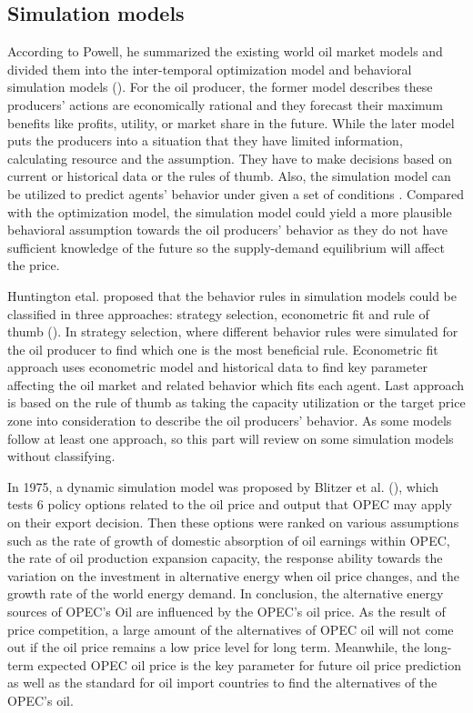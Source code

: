 \subsection{Simulation models}
According to Powell, he summarized the existing world oil market models and divided them into the inter-temporal optimization model and behavioral simulation models (\cite{powell1990target}). For the oil producer, the former model describes these producers' actions are economically rational and they forecast their maximum benefits like profits, utility, or market share in the future. While the later model puts the producers into a situation that they have limited information, calculating resource and the assumption. They have to make decisions based on current or historical data or the rules of thumb. Also, the simulation model can be utilized to predict agents' behavior under given a set of conditions \cite{wurbs1993reservoir}. Compared with the optimization model, the simulation model could yield a more plausible behavioral assumption towards the oil producers' behavior as they do not have sufficient knowledge of the future so the supply-demand equilibrium will affect the price.

Huntington etal. proposed that the behavior rules in simulation models could be classified in three approaches: strategy selection, econometric fit and rule of thumb (\cite{huntington2013oil}). In strategy selection, where different behavior rules were simulated for the oil producer to find which one is the most beneficial rule. Econometric fit approach uses econometric model and historical data to find key parameter affecting the oil market and related behavior which fits each agent. Last approach is based on the rule of thumb as taking the capacity utilization or the target price zone into consideration to describe the oil producers' behavior. As some models follow at least one approach, so this part will review on some simulation models without classifying.

In 1975, a dynamic simulation model was proposed by Blitzer et al. (\cite{blitzer1975dynamic}), which tests 6 policy options related to the oil price and output that OPEC may apply on their export decision. Then these options were ranked on various assumptions such as the rate of growth of domestic absorption of oil earnings within OPEC, the rate of oil production expansion capacity, the response ability towards the variation on the investment in alternative energy when oil price changes, and the growth rate of the world energy demand. In conclusion, the alternative energy sources of OPEC's Oil are influenced by the OPEC's oil price. As the result of price competition, a large amount of the alternatives of OPEC oil will not come out if the oil price remains a low price level for long term. Meanwhile, the long-term expected OPEC oil price is the key parameter for future oil price prediction as well as the standard for oil import countries to find the alternatives of the OPEC's oil.


